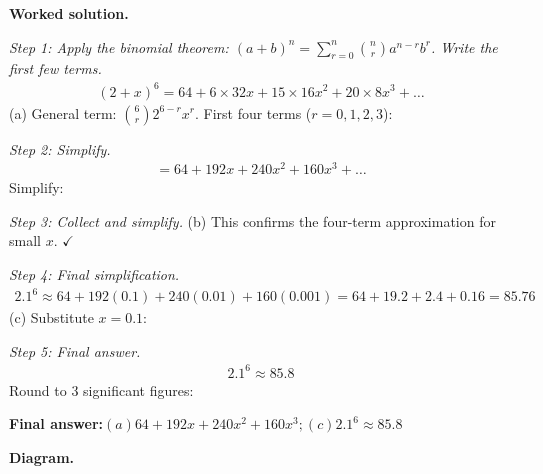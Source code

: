 \documentclass[11pt]{article}
\begin{document}
\textbf{Worked solution.}

\textit{Step 1: Apply the binomial theorem: \((a+b)^n = \sum_{r=0}^{n} \binom{n}{r} a^{n-r} b^r\). Write the first few terms.}
\[\begin{gathered}
(2+x)^6 = 64 + 6 \times 32 x + 15 \times 16 x^2 + 20 \times 8 x^3 + \ldots
\end{gathered}\]
(a) General term: \(\binom{6}{r} 2^{6-r} x^r\). First four terms (\(r = 0, 1, 2, 3\)):

\textit{Step 2: Simplify.}
\[\begin{gathered}
= 64 + 192x + 240x^2 + 160x^3 + \ldots
\end{gathered}\]
Simplify:

\textit{Step 3: Collect and simplify.}
(b) This confirms the four-term approximation for small \(x\). $\checkmark$

\textit{Step 4: Final simplification.}
\[\begin{gathered}
2.1^6 \approx 64 + 192(0.1) + 240(0.01) + 160(0.001) = 64 + 19.2 + 2.4 + 0.16 = 85.76
\end{gathered}\]
(c) Substitute \(x = 0.1\):

\textit{Step 5: Final answer.}
\[\begin{gathered}
2.1^6 \approx 85.8
\end{gathered}\]
Round to 3 significant figures:

\begin{answerbox}
\textbf{Final answer:}\quad \(\displaystyle (a) 64 + 192x + 240x^2 + 160x^3; (c) 2.1^6 \approx 85.8\)
\end{answerbox}
\textbf{Diagram.}
\end{document}
